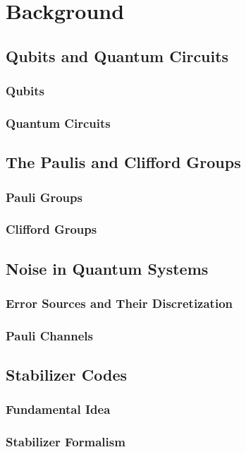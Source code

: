 \chapter{Background}

\section{Qubits and Quantum Circuits}
\subsection{Qubits}
\subsection{Quantum Circuits}


\section{The Paulis and Clifford Groups}
\subsection{Pauli Groups}
\subsection{Clifford Groups}

\section{Noise in Quantum Systems}
\subsection{Error Sources and Their Discretization}
\subsection{Pauli Channels}

\section{Stabilizer Codes}
\subsection{Fundamental Idea}
\subsection{Stabilizer Formalism}
